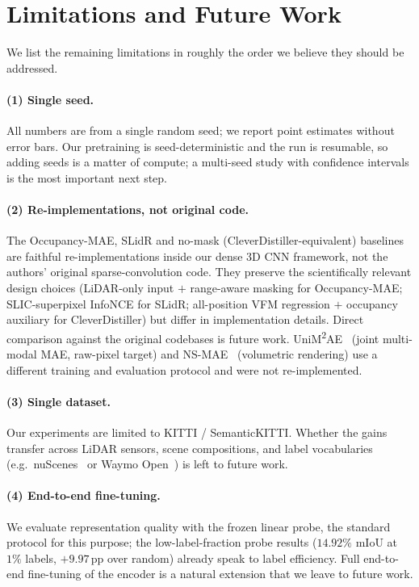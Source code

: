 \section{Limitations and Future Work}
\label{sec:limitations}

We list the remaining limitations in roughly the order we believe they
should be addressed.

\paragraph{(1) Single seed.}
All numbers are from a single random seed; we report point estimates
without error bars. Our pretraining is seed-deterministic and the run is
resumable, so adding seeds is a matter of compute; a multi-seed study with
confidence intervals is the most important next step.

\paragraph{(2) Re-implementations, not original code.}
The Occupancy-MAE, SLidR and no-mask (CleverDistiller-equivalent)
baselines are faithful re-implementations inside our dense 3D CNN
framework, not the authors' original sparse-convolution code. They
preserve the scientifically relevant design choices (LiDAR-only input $+$
range-aware masking for Occupancy-MAE; SLIC-superpixel InfoNCE for SLidR;
all-position VFM regression $+$ occupancy auxiliary for CleverDistiller)
but differ in implementation details. Direct comparison against the
original codebases is future work. UniM\textsuperscript{2}AE~\cite{unim2ae}
(joint multi-modal MAE, raw-pixel target) and NS-MAE~\cite{nsmae}
(volumetric rendering) use a different training and evaluation protocol and
were not re-implemented.

\paragraph{(3) Single dataset.}
Our experiments are limited to KITTI / SemanticKITTI. Whether the gains
transfer across LiDAR sensors, scene compositions, and label vocabularies
(e.g.\ nuScenes~\cite{nuscenes} or Waymo Open~\cite{waymo}) is left to future work.

\paragraph{(4) End-to-end fine-tuning.}
We evaluate representation quality with the frozen linear probe, the
standard protocol for this purpose; the low-label-fraction probe results
($14.92\%$ mIoU at $1\%$ labels, $+9.97$\,pp over random) already speak to
label efficiency. Full end-to-end fine-tuning of the encoder is a natural extension that
we leave to future work.

